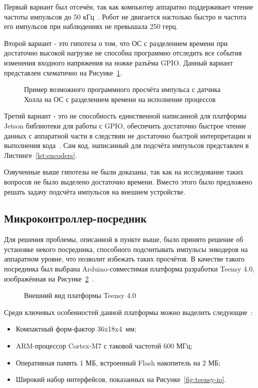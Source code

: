 Первый вариант был отсечён, так как компьютер аппаратно поддерживает чтение частоты импульсов до 50 кГц~\cite{gpio-limits}. Робот не двигается настолько быстро и частота его импульсов при наблюдениях не превышала 250 герц.

Второй вариант - это гипотеза о том, что ОС с разделением времени при достаточно высокой нагрузке не способна программно отследить все события изменения входного напряжения на ножке разъёма GPIO. Данный вариант представлен схематично на Рисунке~\cref{fig:miscount}.

\begin{figure}[ht]
    \caption{Пример возможного программного просчёта импульса с датчика Холла на ОС с разделением времени на исполнение процессов}\label{fig:miscount}
\end{figure}

Третий вариант - это не способность единственной написанной для платформы Jetson библиотеки для работы с GPIO, обеспечить достаточно быстрое чтение данных с аппаратной части в следствии не достаточно быстрой интерпретации и выполнения кода~\cite{gpio-limits}. Сам код, написанный для подсчёта импульсов представлен в Листинге~\cref{lst:encoders}.

Озвученные выше гипотезы не были доказаны, так как на исследование таких вопросов не было выделено достаточно времени. Вместо этого было предложено решать задачу подсчёта импульсов на внешнем устройстве.

\subsection{Микроконтроллер-посредник}
Для решения проблемы, описанной в пункте выше, было принято решение об установке некого посредника, способного подсчитывать импульсы энкодеров на аппаратном уровне, что позволит избежать таких просчётов. В качестве такого посредника был выбрана Arduino-совместимая платформа разработки Teensy 4.0, изображённая на Рисунке~\cref{fig:teensy}~\cite{teensy}.

\begin{figure}[ht]
    \caption{Внешний вид платформы Teensy 4.0}\label{fig:teensy}
\end{figure}

Среди ключевых особенностей данной платформы можно выделить следующие~\cite{teensy}:
\begin{itemize}[beginpenalty=10000] %
  \item Компактный форм-фактор 36x18x4~мм;
  \item ARM-процессор Cortex-M7 с таковой частотой 600 МГц;
  \item Оперативная память 1 МБ, встроенный Flash накопитель на 2 МБ;
  \item Широкий набор интерфейсов, показанных на Рисунке~\cref{fig:teensy-io}.
\end{itemize}

